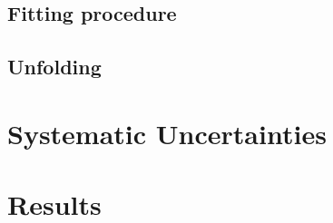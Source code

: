 \subsection{Fitting procedure}
\label{ss_xsection:fitting}

\subsection{Unfolding}
\label{ss_xsection:unfolding}

\section{Systematic Uncertainties}
\label{s_xsection:systematics}

\section{Results}
\label{s_xsection:results}

